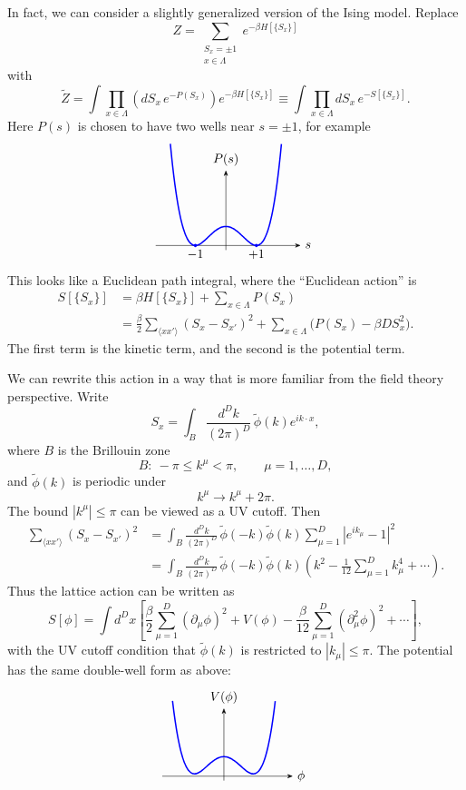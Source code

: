 In fact, we can consider a slightly generalized version of the Ising model.
Replace
\[
  Z=\sum_{\substack{S_x=\pm1\\ x\in\Lambda}}
  e^{-\beta H[\{S_x\}]}
\]
with
\[
  \widetilde Z
  =
  \int\prod_{x\in\Lambda}\left(dS_x\,e^{-P(S_x)}\right)
  e^{-\beta H[\{S_x\}]}
  \equiv
  \int\prod_{x\in\Lambda}dS_x\,
  e^{-S[\{S_x\}]} .
\]
Here \(P(s)\) is chosen to have two wells near \(s=\pm1\), for example
\[
\begin{tikzpicture}[>=Stealth,scale=0.85,baseline=(current bounding box.center)]
  \draw[->] (-2.3,0)--(2.45,0) node[right] {\(s\)};
  \draw[->] (0,-.15)--(0,2.45) node[above] {\(P(s)\)};
  \draw[blue,line width=1.1pt]
    plot[smooth,domain=-1.82:1.82,samples=100]
    (\x,{0.62*(\x*\x-1)^2});
  \fill[blue] (-1,0) circle (1.5pt) node[below,black] {\(-1\)};
  \fill[blue] (1,0) circle (1.5pt) node[below,black] {\(+1\)};
\end{tikzpicture}
\]
This looks like a Euclidean path integral, where the ``Euclidean action''
is
\[
\begin{aligned}
  S[\{S_x\}]
  &=
  \beta H[\{S_x\}]+\sum_{x\in\Lambda}P(S_x)
\\
  &=
  \frac{\beta}{2}\sum_{\langle xx'\rangle}(S_x-S_{x'})^2
  +\sum_{x\in\Lambda}\bigl(P(S_x)-\beta D S_x^2\bigr).
\end{aligned}
\]
The first term is the kinetic term, and the second is the potential term.

We can rewrite this action in a way that is more familiar from the field
theory perspective.  Write
\[
  S_x
  =
  \int_B\frac{d^Dk}{(2\pi)^D}\,
  \widetilde\phi(k)e^{ik\cdot x},
\]
where \(B\) is the Brillouin zone
\[
  B:\ -\pi\leq k^\mu<\pi,\qquad \mu=1,\ldots,D,
\]
and \(\widetilde\phi(k)\) is periodic under
\[
  k^\mu\to k^\mu+2\pi .
\]
The bound \(|k^\mu|\leq\pi\) can be viewed as a UV cutoff.  Then
\[
\begin{aligned}
  \sum_{\langle xx'\rangle}(S_x-S_{x'})^2
  &=
  \int_B\frac{d^Dk}{(2\pi)^D}\,
  \widetilde\phi(-k)\widetilde\phi(k)
  \sum_{\mu=1}^D\left|e^{ik_\mu}-1\right|^2
\\
  &=
  \int_B\frac{d^Dk}{(2\pi)^D}\,
  \widetilde\phi(-k)\widetilde\phi(k)
  \left(k^2-\frac{1}{12}\sum_{\mu=1}^D k_\mu^4+\cdots\right).
\end{aligned}
\]
Thus the lattice action can be written as
\[
  S[\phi]
  =
  \int d^Dx\left[
    \frac{\beta}{2}\sum_{\mu=1}^D(\partial_\mu\phi)^2
    +V(\phi)
    -\frac{\beta}{12}\sum_{\mu=1}^D(\partial_\mu^2\phi)^2
    +\cdots
  \right],
\]
with the UV cutoff condition that \(\widetilde\phi(k)\) is restricted to
\(|k_\mu|\leq\pi\).  The potential has the same double-well form as above:
\[
\begin{tikzpicture}[>=Stealth,scale=0.82,baseline=(current bounding box.center)]
  \draw[->] (-2.1,0)--(2.35,0) node[right] {\(\phi\)};
  \draw[->] (0,-.15)--(0,2.3) node[above] {\(V(\phi)\)};
  \draw[blue,line width=1.1pt]
    plot[smooth,domain=-1.75:1.75,samples=100]
    (\x,{0.58*(\x*\x-1)^2+.08});
\end{tikzpicture}
\]

